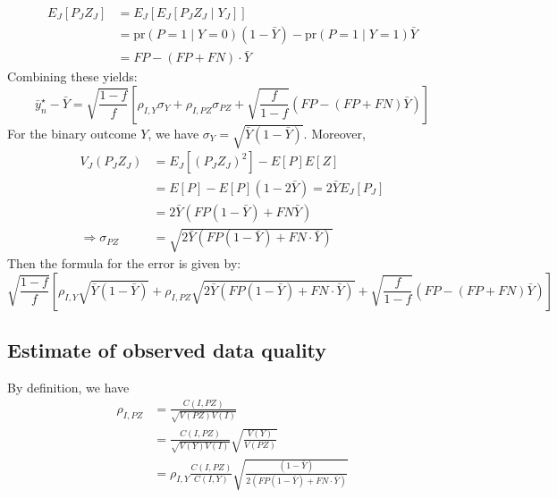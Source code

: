 \documentclass[aoas]{amsart}
\def\pr{\text{pr}}
\begin{document}
$$
\begin{aligned}
E_J [P_J Z_J ] &= E_J [ E_J [ P_J Z_J \mid Y_J ] ] \\
&= \pr (P = 1 \mid Y = 0) (1-\bar Y) - \pr(P=1 \mid Y = 1) \bar Y \\
&= FP - (FP + FN) \cdot \bar Y
\end{aligned}
$$
Combining these yields:
$$
\bar y_n^\star - \bar Y = \sqrt{\frac{1-f}{f}} \left[\rho_{I,Y} \sigma_Y + \rho_{I, PZ} \sigma_{PZ} + \sqrt{\frac{f}{1-f}} \left( FP - (FP+FN) \bar Y \right) \right]
$$
For the binary outcome $Y$, we have $\sigma_Y = \sqrt{\bar Y (1-\bar Y)}$. Moreover,
$$
\begin{aligned}
V_J(P_J Z_J) &= E_J[(P_J Z_J)^2] - E[P] E[Z] \\
&= E[P] - E[P] (1 - 2 \bar Y) = 2 \bar Y E_J [ P_J ] \\
&= 2 \bar Y \left( FP (1-\bar Y) + FN \bar Y \right) \\
\Rightarrow \sigma_{PZ} &= \sqrt{ 2 \bar Y \left( FP (1-\bar Y) + FN \cdot  \bar Y \right) }
\end{aligned}
$$
Then the formula for the error is given by:
$$
\sqrt{\frac{1-f}{f}} \left[\rho_{I,Y} \sqrt{\bar Y (1-\bar Y)} + \rho_{I, PZ} \sqrt{ 2 \bar Y \left( FP (1-\bar Y) + FN \cdot \bar Y \right )} + \sqrt{\frac{f}{1-f}} \left( FP - (FP+FN) \bar Y \right) \right]
$$

\subsection{Estimate of observed data quality}

By definition, we have
$$
\begin{aligned}
\rho_{I,PZ} &= \frac{C(I, PZ)}{\sqrt{V(PZ) V(I)}} \\
&= \frac{C(I, PZ)}{\sqrt{V(Y) V(I)}} \sqrt{\frac{V(Y)}{V(PZ)}} \\
&= \rho_{I,Y} \frac{C(I,PZ)}{C(I,Y)} \sqrt{ \frac{(1-\bar Y)}{2 ( FP (1-\bar Y) + FN \cdot \bar Y)} }
\end{aligned}
$$
\end{document}
